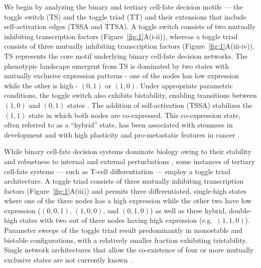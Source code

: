 \documentclass[11pt]{article}
\begin{document}
We begin by analyzing the binary and tertiary cell-fate decision motifs --- the toggle switch (TS) and the toggle triad (TT) and their extensions that include self-activation edges (TSSA and TTSA). A toggle switch consists of two mutually inhibiting transcription factors (Figure~\ref{fig:1}A(i-ii)), whereas a toggle triad consists of three mutually inhibiting transcription factors (Figure~\ref{fig:1}A(iii-iv)). TS represents the core motif underlying binary cell-fate decision networks. The phenotypic landscape emergent from TS is dominated by two states with mutually exclusive expression patterns - one of the nodes has low expression while the other is high - $(0,1)$ or $(1,0)$. Under appropriate parametric conditions, the toggle switch also exhibits bistability, enabling transitions between $(1,0)$ and $(0,1)$ states \cite{gardner2000construction}. The addition of self-activation (TSSA) stabilizes the $(1,1)$ state in which both nodes are co-expressed. This co-expression state, often referred to as a ``hybrid'' state, has been associated with stemness in development \cite{Roeder2006TowardsPU.1} and with high plasticity and pro-metastatic features in cancer \cite{jolly2015implications,jolly2018hybrid,Pastushenko2019EMTMetastasis}.

While binary cell-fate decision systems dominate biology owing to their stability and robustness to internal and external perturbations \cite{harlapur2022functional, Shyam2025MutuallyNetworks}, some instances of tertiary cell-fate systems --- such as T-cell differentiation --- employ a toggle triad architecture. A toggle triad consists of three mutually inhibiting transcription factors (Figure~\ref{fig:1}A(iii)) and permits three differentiated, single-high states where one of the three nodes has a high expression while the other two have low expression ($(0,0,1)$, $(1,0,0)$, and $(0,1,0)$) as well as three hybrid, double-high states with two out of three nodes having high expression (e.g.\ $(1,1,0)$). Parameter sweeps of the toggle triad result predominantly in monostable and bistable configurations, with a relatively smaller fraction exhibiting tristability. Single network architectures that allow the co-existence of four or more mutually exclusive states are not currently known~\cite{Bv2026GeneDecisions}.
\end{document}
